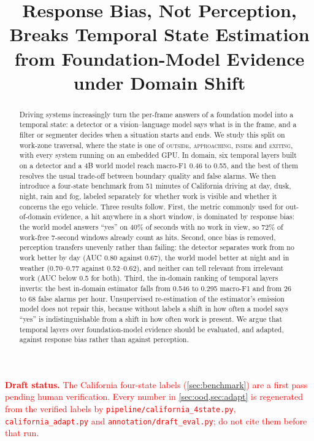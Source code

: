 \documentclass[conference]{IEEEtran}
\title{Response Bias, Not Perception, Breaks Temporal State Estimation\\from Foundation-Model Evidence under Domain Shift}
\author{\IEEEauthorblockN{Anonymous Authors}\IEEEauthorblockA{Paper under double-blind review}}
\newcommand{\st}[1]{\textsc{#1}}
\newcommand{\draftnote}[1]{\textcolor{red}{#1}}
\begin{document}
\maketitle

\draftnote{\textbf{Draft status.} The California four-state labels (\cref{sec:benchmark}) are a first pass pending human verification. Every number in \cref{sec:ood,sec:adapt} is regenerated from the verified labels by \texttt{pipeline/california\_4state.py}, \texttt{california\_adapt.py} and \texttt{annotation/draft\_eval.py}; do not cite them before that run.}

\begin{abstract}
Driving systems increasingly turn the per-frame answers of a foundation model into a temporal state: a detector or a vision--language model says what is in the frame, and a filter or segmenter decides when a situation starts and ends. We study this split on work-zone traversal, where the state is one of \st{outside}, \st{approaching}, \st{inside} and \st{exiting}, with every system running on an embedded GPU. In domain, six temporal layers built on a detector and a 4B world model reach macro-F1 0.46 to 0.55, and the best of them resolves the usual trade-off between boundary quality and false alarms. We then introduce a four-state benchmark from 51 minutes of California driving at day, dusk, night, rain and fog, labeled separately for whether work is visible and whether it concerns the ego vehicle. Three results follow. First, the metric commonly used for out-of-domain evidence, a hit anywhere in a short window, is dominated by response bias: the world model answers ``yes'' on 40\% of seconds with no work in view, so 72\% of work-free 7-second windows already count as hits. Second, once bias is removed, perception transfers unevenly rather than failing: the detector separates work from no work better by day (AUC 0.80 against 0.67), the world model better at night and in weather (0.70--0.77 against 0.52--0.62), and neither can tell relevant from irrelevant work (AUC below 0.5 for both). Third, the in-domain ranking of temporal layers inverts: the best in-domain estimator falls from 0.546 to 0.295 macro-F1 and from 26 to 68 false alarms per hour. Unsupervised re-estimation of the estimator's emission model does not repair this, because without labels a shift in how often a model says ``yes'' is indistinguishable from a shift in how often work is present. We argue that temporal layers over foundation-model evidence should be evaluated, and adapted, against response bias rather than against perception.
\end{abstract}
\end{document}
